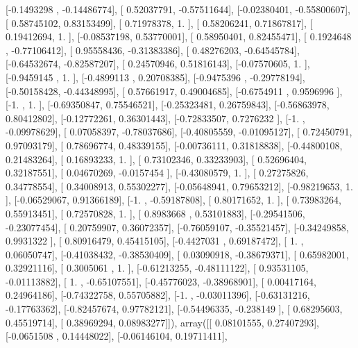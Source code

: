 \documentclass{article}
\begin{document}
       [-0.1493298 , -0.14486774],
       [ 0.52037791, -0.57511644],
       [-0.02380401, -0.55800607],
       [ 0.58745102,  0.83153499],
       [ 0.71978378,  1.        ],
       [ 0.58206241,  0.71867817],
       [ 0.19412694,  1.        ],
       [-0.08537198,  0.53770001],
       [ 0.58950401,  0.82455471],
       [ 0.1924648 , -0.77106412],
       [ 0.95558436, -0.31383386],
       [ 0.48276203, -0.64545784],
       [-0.64532674, -0.82587207],
       [ 0.24570946,  0.51816143],
       [-0.07570605,  1.        ],
       [-0.9459145 ,  1.        ],
       [-0.4899113 ,  0.20708385],
       [-0.9475396 , -0.29778194],
       [-0.50158428, -0.44348995],
       [ 0.57661917,  0.49004685],
       [-0.6754911 ,  0.9596996 ],
       [-1.        ,  1.        ],
       [-0.69350847,  0.75546521],
       [-0.25323481,  0.26759843],
       [-0.56863978,  0.80412802],
       [-0.12772261,  0.36301443],
       [-0.72833507,  0.7276232 ],
       [-1.        , -0.09978629],
       [ 0.07058397, -0.78037686],
       [-0.40805559, -0.01095127],
       [ 0.72450791,  0.97093179],
       [ 0.78696774,  0.48339155],
       [-0.00736111,  0.31818838],
       [-0.44800108,  0.21483264],
       [ 0.16893233,  1.        ],
       [ 0.73102346,  0.33233903],
       [ 0.52696404,  0.32187551],
       [ 0.04670269, -0.0157454 ],
       [-0.43080579,  1.        ],
       [ 0.27275826,  0.34778554],
       [ 0.34008913,  0.55302277],
       [-0.05648941,  0.79653212],
       [-0.98219653,  1.        ],
       [-0.06529067,  0.91366189],
       [-1.        , -0.59187808],
       [ 0.80171652,  1.        ],
       [ 0.73983264,  0.55913451],
       [ 0.72570828,  1.        ],
       [ 0.8983668 ,  0.53101883],
       [-0.29541506, -0.23077454],
       [ 0.20759907,  0.36072357],
       [-0.76059107, -0.35521457],
       [-0.34249858,  0.9931322 ],
       [ 0.80916479,  0.45415105],
       [-0.4427031 ,  0.69187472],
       [ 1.        ,  0.06050747],
       [-0.41038432, -0.38530409],
       [ 0.03090918, -0.38679371],
       [ 0.65982001,  0.32921116],
       [ 0.3005061 ,  1.        ],
       [-0.61213255, -0.48111122],
       [ 0.93531105, -0.01113882],
       [ 1.        , -0.65107551],
       [-0.45776023, -0.38968901],
       [ 0.00417164,  0.24964186],
       [-0.74322758,  0.55705882],
       [-1.        , -0.03011396],
       [-0.63131216, -0.17763362],
       [-0.82457674,  0.97782121],
       [-0.54496335, -0.238149  ],
       [ 0.68295603,  0.45519714],
       [ 0.38969294,  0.08983277]]), array([[ 0.08101555,  0.27407293],
       [-0.0651508 ,  0.14448022],
       [-0.06146104,  0.19711411],
\end{document}
